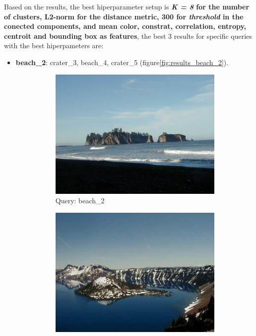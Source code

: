 Based on the results, the best hiperparameter setup is \textbf{\textit{K = 8} for the number of clusters, L2-norm for the distance metric, 300 for \textit{threshold} in the conected components, and mean color, constrat, correlation, entropy, centroit and bounding box as features}, the best 3 results for  specific queries with the best hiperpameters are:

\begin{itemize}
\item \textbf{beach\_2}: crater\_3, beach\_4, crater\_5 (figure\ref{fig:results_beach_2}).

\begin{figure}[H]
	\centering
	\begin{subfigure}{0.25\textwidth}
	  \centering
	  \includegraphics[width=0.9\linewidth]{../input/beach_2.jpg}
	  \caption{Query: beach\_2}
	\end{subfigure}%
	\begin{subfigure}{0.25\textwidth}
	  \centering
	  \includegraphics[width=0.9\linewidth]{../input/crater_3.jpg}

\end{subfigure}
\end{figure}
\end{itemize}
